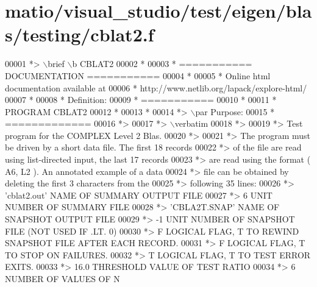 \hypertarget{matio_2visual__studio_2test_2eigen_2blas_2testing_2cblat2_8f_source}{}\section{matio/visual\+\_\+studio/test/eigen/blas/testing/cblat2.f}
\label{matio_2visual__studio_2test_2eigen_2blas_2testing_2cblat2_8f_source}

\begin{DoxyCode}
00001 \textcolor{comment}{*> \(\backslash\)brief \(\backslash\)b CBLAT2}
00002 \textcolor{comment}{*}
00003 \textcolor{comment}{*  =========== DOCUMENTATION ===========}
00004 \textcolor{comment}{*}
00005 \textcolor{comment}{* Online html documentation available at }
00006 \textcolor{comment}{*            http://www.netlib.org/lapack/explore-html/ }
00007 \textcolor{comment}{*}
00008 \textcolor{comment}{*  Definition:}
00009 \textcolor{comment}{*  ===========}
00010 \textcolor{comment}{*}
00011 \textcolor{comment}{*       PROGRAM CBLAT2}
00012 \textcolor{comment}{* }
00013 \textcolor{comment}{*}
00014 \textcolor{comment}{*> \(\backslash\)par Purpose:}
00015 \textcolor{comment}{*  =============}
00016 \textcolor{comment}{*>}
00017 \textcolor{comment}{*> \(\backslash\)verbatim}
00018 \textcolor{comment}{*>}
00019 \textcolor{comment}{*> Test program for the COMPLEX          Level 2 Blas.}
00020 \textcolor{comment}{*>}
00021 \textcolor{comment}{*> The program must be driven by a short data file. The first 18 records}
00022 \textcolor{comment}{*> of the file are read using list-directed input, the last 17 records}
00023 \textcolor{comment}{*> are read using the format ( A6, L2 ). An annotated example of a data}
00024 \textcolor{comment}{*> file can be obtained by deleting the first 3 characters from the}
00025 \textcolor{comment}{*> following 35 lines:}
00026 \textcolor{comment}{*> 'cblat2.out'      NAME OF SUMMARY OUTPUT FILE}
00027 \textcolor{comment}{*> 6                 UNIT NUMBER OF SUMMARY FILE}
00028 \textcolor{comment}{*> 'CBLA2T.SNAP'     NAME OF SNAPSHOT OUTPUT FILE}
00029 \textcolor{comment}{*> -1                UNIT NUMBER OF SNAPSHOT FILE (NOT USED IF .LT. 0)}
00030 \textcolor{comment}{*> F        LOGICAL FLAG, T TO REWIND SNAPSHOT FILE AFTER EACH RECORD.}
00031 \textcolor{comment}{*> F        LOGICAL FLAG, T TO STOP ON FAILURES.}
00032 \textcolor{comment}{*> T        LOGICAL FLAG, T TO TEST ERROR EXITS.}
00033 \textcolor{comment}{*> 16.0     THRESHOLD VALUE OF TEST RATIO}
00034 \textcolor{comment}{*> 6                 NUMBER OF VALUES OF N}

\end{DoxyCode}
